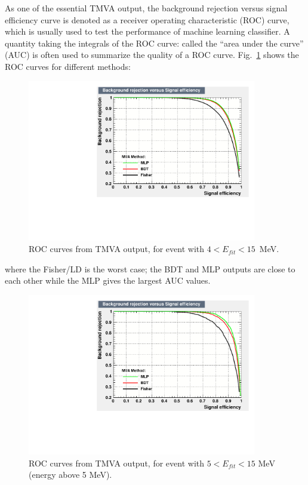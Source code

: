 As one of the essential TMVA output, the background rejection versus signal efficiency curve is denoted as a receiver operating characteristic (ROC) curve, which is usually used to test the performance of machine learning classifier. A quantity taking the integrals of the ROC curve: called the ``area under the curve'' (AUC) is often used to summarize the quality of a ROC curve\cite{murphy2012machine}.  Fig.~\ref{allE_roc} shows the ROC curves for different methods:
\begin{figure}[!htb]
	\centering
	\includegraphics[width=10cm]{ROC_E4to15.pdf}
	\caption{ROC curves from TMVA output, for event with $4<E_{fit}<15$~MeV.}
	\label{allE_roc}
\end{figure}
where the Fisher/LD is the worst case; the BDT and MLP outputs are close to each other while the MLP gives the largest AUC values.

\begin{figure}[!htb]
	\centering
	\includegraphics[width=10cm]{ROC_E5to15.pdf}
	\caption{ROC curves from TMVA output, for event with $5<E_{fit}<15$ MeV (energy above 5 MeV).}
	\label{E5to15_roc}
\end{figure}


